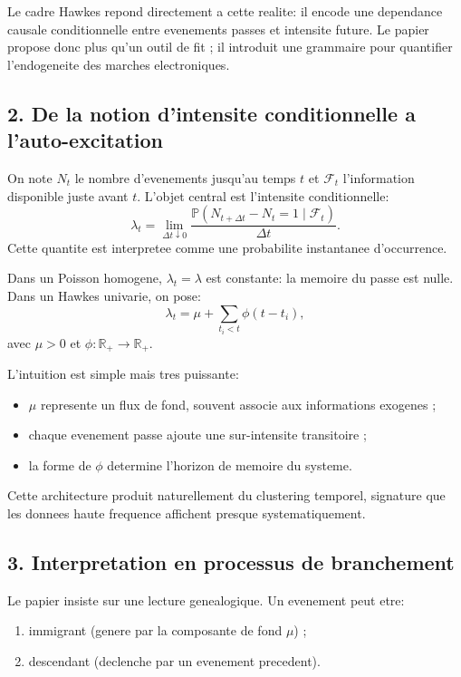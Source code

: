 \documentclass[11pt,a4paper]{article}
\begin{document}
Le cadre Hawkes repond directement a cette realite: il encode une dependance causale conditionnelle entre evenements passes et intensite future. Le papier propose donc plus qu'un outil de fit ; il introduit une grammaire pour quantifier l'endogeneite des marches electroniques.

\subsection*{2. De la notion d'intensite conditionnelle a l'auto-excitation}

On note $N_t$ le nombre d'evenements jusqu'au temps $t$ et $\mathcal{F}_t$ l'information disponible juste avant $t$. L'objet central est l'intensite conditionnelle:
\[
\lambda_t = \lim_{\Delta t\downarrow 0}\frac{\mathbb{P}(N_{t+\Delta t}-N_t=1\mid\mathcal{F}_t)}{\Delta t}.
\]
Cette quantite est interpretee comme une probabilite instantanee d'occurrence.

Dans un Poisson homogene, $\lambda_t=\lambda$ est constante: la memoire du passe est nulle. Dans un Hawkes univarie, on pose:
\begin{equation}
\lambda_t = \mu + \sum_{t_i<t}\phi(t-t_i),
\label{eq:hawkes_uni}
\end{equation}
avec $\mu>0$ et $\phi:\mathbb{R}_+\to\mathbb{R}_+$.

L'intuition est simple mais tres puissante:
\begin{itemize}[leftmargin=1.2cm]
    \item $\mu$ represente un flux de fond, souvent associe aux informations exogenes ;
    \item chaque evenement passe ajoute une sur-intensite transitoire ;
    \item la forme de $\phi$ determine l'horizon de memoire du systeme.
\end{itemize}

Cette architecture produit naturellement du clustering temporel, signature que les donnees haute frequence affichent presque systematiquement.

\subsection*{3. Interpretation en processus de branchement}

Le papier insiste sur une lecture genealogique. Un evenement peut etre:
\begin{enumerate}[leftmargin=1.2cm]
    \item immigrant (genere par la composante de fond $\mu$) ;
    \item descendant (declenche par un evenement precedent).
\end{enumerate}
\end{document}
